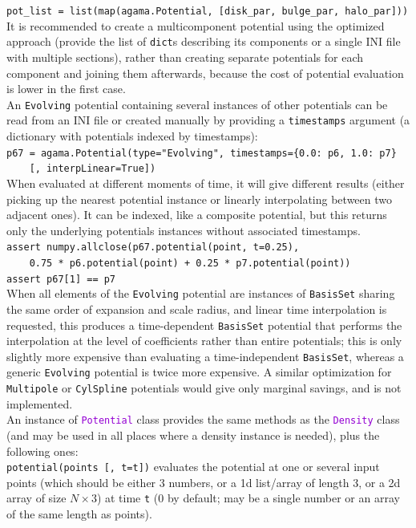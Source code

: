 \documentclass[12pt]{article}
\newcommand{\ttt}[1]{\textcolor{darkviolet}{\texttt{#1}}}
\newcommand{\ppp}[1]{\textcolor{darkolive} {\texttt{#1}}}
\begin{document}
\texttt{pot_list = list(map(agama.Potential, [disk_par, bulge_par, halo_par]))}\\
It is recommended to create a multicomponent potential using the optimized approach (provide the list of \texttt{dict}s describing its components or a single INI file with multiple sections), rather than creating separate potentials for each component and joining them afterwards, because the cost of potential evaluation is lower in the first case.\\[2mm]
An \ppp{Evolving} potential containing several instances of other potentials can be read from an INI file or created manually by providing a \texttt{timestamps} argument (a dictionary with potentials indexed by timestamps):\\
\texttt{p67 = agama.Potential(type="Evolving", timestamps=\{0.0:~p6, 1.0:~p7\}\\
\mbox{}~~~~[, interpLinear=True])}\\
When evaluated at different moments of time, it will give different results (either picking up the nearest potential instance or linearly interpolating between two adjacent ones). It can be indexed, like a composite potential, but this returns only the underlying potentials instances without associated timestamps.\\
\texttt{assert numpy.allclose(p67.potential(point, t=0.25), \\
\mbox{}~~~~0.75 * p6.potential(point) + 0.25 * p7.potential(point))}\\
\texttt{assert p67[1] == p7}\\
When all elements of the \ppp{Evolving} potential are instances of \ppp{BasisSet} sharing the same order of expansion and scale radius, and linear time interpolation is requested, this produces a time-dependent \ppp{BasisSet} potential that performs the interpolation at the level of coefficients rather than entire potentials; this is only slightly more expensive than evaluating a time-independent \ppp{BasisSet}, whereas a generic \ppp{Evolving} potential is twice more expensive. A similar optimization for \ppp{Multipole} or \ppp{CylSpline} potentials would give only marginal savings, and is not implemented.
\\[2mm]
An instance of \ttt{Potential} class provides the same methods as the \ttt{Density} class (and may be used in all places where a density instance is needed), plus the following ones:\\[2mm]
\texttt{potential(points [, t=t])} evaluates the potential at one or several input points (which should be either 3 numbers, or a 1d list/array of length 3, or a 2d array of size $N\times3$) at time \texttt{t} (0 by default; may be a single number or an array of the same length as points).\\[2mm]
\end{document}
